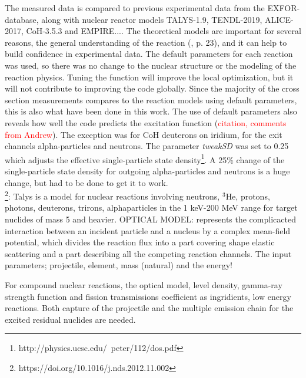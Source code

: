\noindent 
The measured data is compared to previous experimental data from the EXFOR-database, along with nuclear reactor models TALYS-1.9, TENDL-2019, ALICE-2017\cite{Blann1996}, CoH-3.5.3 and EMPIRE.... The theoretical models are important for several reasons, the general understanding of the reaction (\cite{international2012iaea}, p. 23), and it can help to build confidence in experimental data. The default parameters for each reaction was used, so there was no change to the nuclear structure or the modeling of the reaction physics. Tuning the function will improve the local optimization, but it will not contribute to improving the code globally. Since the majority of the cross section measurements compares to the reaction models using default parameters, this is also what have been done in this work. The use of default parameters also reveals how well the code predicts the excitation function (\textcolor{red}{citation, comments from Andrew}). The exception was for CoH deuterons on iridium, for the exit channels alpha-particles and neutrons. The parameter \textit{tweakSD} was set to 0.25 which adjusts the effective single-particle state density\footnote{http://physics.ucsc.edu/~peter/112/dos.pdf}. A 25\% change of the single-particle state density for outgoing alpha-particles and neutrons is a huge change, but had to be done to get it to work. \\

\footnote{https://doi.org/10.1016/j.nds.2012.11.002}: Talys is a model for nuclear reactions involving neutrons, $^3$He, protons, photons, deuterons, trirons, alphaparticles in the 1 keV-200 MeV range for target nuclides of mass 5 and heavier. 
OPTICAL MODEL: represents the complicacted interaction between an incident particle and a nucleus by a complex mean-field potential, which divides the reaction flux into a part covering shape elastic scattering and a part describing all the competing reaction channels. The input parameters; projectile, element, mass (natural) and the energy! 

For compound nuclear reactions, the optical model, level density, gamma-ray strength function and fission transmissions coefficient as ingridients, low energy reactions. Both capture of the projectile and the multiple emission chain for the excited residual nuclides are needed. 










